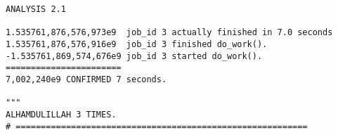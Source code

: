 \begin{lstlisting}[caption={App4-Julia Parallel Programming Codes}, label=App4-Julia Parallel Programming Codes]
ANALYSIS 2.1

1.535761,876,576,973e9 	job_id 3 actually finished in 7.0 seconds 
1.535761,876,576,916e9 	job_id 3 finished do_work(). 
-1.535761,869,574,676e9 job_id 3 started do_work().  
=======================
7,002,240e9 CONFIRMED 7 seconds.

"""
ALHAMDULILLAH 3 TIMES.
# ==========================================================
\end{lstlisting}

